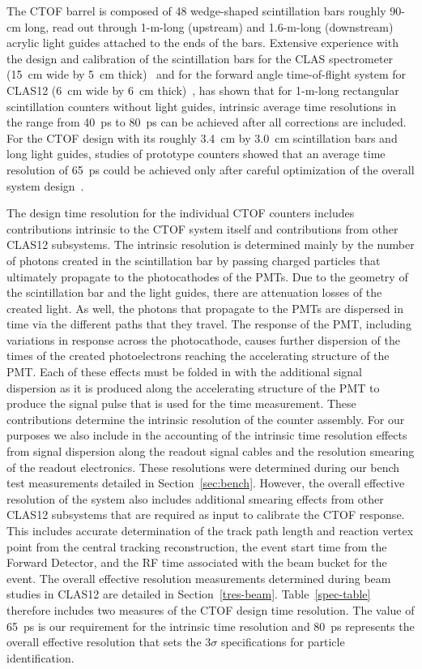 \documentclass{elsart}
\begin{document}
The CTOF barrel is composed of 48 wedge-shaped scintillation bars roughly 90-cm long, read out
through 1-m-long (upstream) and 1.6-m-long (downstream) acrylic light guides attached to the 
ends of the bars. Extensive experience with the design and calibration of the scintillation bars for 
the CLAS spectrometer (15~cm wide by 5~cm thick)~\cite{tof-nim} and for the forward angle 
time-of-flight system for CLAS12 (6~cm wide by 6~cm thick)~\cite{ftof-ref}, has shown that for 
1-m-long rectangular scintillation counters without light guides, intrinsic average time resolutions
in the range from 40~ps to 80~ps can be achieved after all corrections are included. For the CTOF
design with its roughly 3.4~cm by 3.0~cm scintillation bars and long light guides, studies of prototype
counters showed that an average time resolution of 65~ps could be achieved only after careful
optimization of the overall system design~\cite{baturin-2009}.

The design time resolution for the individual CTOF counters includes contributions intrinsic to the
CTOF system itself and contributions from other CLAS12 subsystems. The intrinsic resolution
is determined mainly by the number of photons created in the scintillation bar by passing charged
particles that ultimately propagate to the photocathodes of the PMTs. Due to the geometry of the
scintillation bar and the light guides, there are attenuation losses of the created light. As well, the
photons that propagate to the PMTs are dispersed in time via the different paths that they travel.
The response of the PMT, including variations in response across the photocathode, causes further
dispersion of the times of the created photoelectrons reaching the accelerating structure of the PMT.
Each of these effects must be folded in with the additional signal dispersion as it is produced along the
accelerating structure of the PMT to produce the signal pulse that is used for the time measurement.
These contributions determine the intrinsic resolution of the counter assembly. For our purposes we also
include in the accounting of the intrinsic time resolution effects from signal dispersion along the readout
signal cables and the resolution smearing of the readout electronics. These resolutions were determined
during our bench test measurements detailed in Section~\ref{sec:bench}. However, the overall effective
resolution of the system also includes additional smearing effects from other CLAS12 subsystems that
are required as input to calibrate the CTOF response. This includes accurate determination of the track
path length and reaction vertex point from the central tracking reconstruction, the event start time from
the Forward Detector, and the RF time associated with the beam bucket for the event. The overall
effective resolution measurements determined during beam studies in CLAS12 are detailed in
Section~\ref{tres-beam}. Table~\ref{spec-table} therefore includes two measures of the CTOF design
time resolution. The value of 65~ps is our requirement for the intrinsic time resolution and 80~ps
represents the overall effective resolution that sets the 3$\sigma$ specifications for particle
identification.
\end{document}
